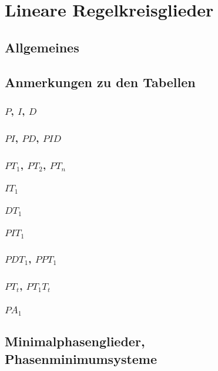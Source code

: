 \section{Lineare Regelkreisglieder}


\subsection{Allgemeines}


\subsection{Anmerkungen zu den Tabellen}


\subsubsection{$P$, $I$, $D$}


\subsubsection{$PI$, $PD$, $PID$}


\subsubsection{$PT_1$, $PT_2$, $PT_n$}


\subsubsection{$IT_1$}


\subsubsection{$DT_1$}


\subsubsection{$PIT_1$}


\subsubsection{$PDT_1$, $PPT_1$}


\subsubsection{$PT_t$, $PT_1 T_t$}


\subsubsection{$PA_1$}


\subsection{Minimalphasenglieder, Phasenminimumsysteme}
